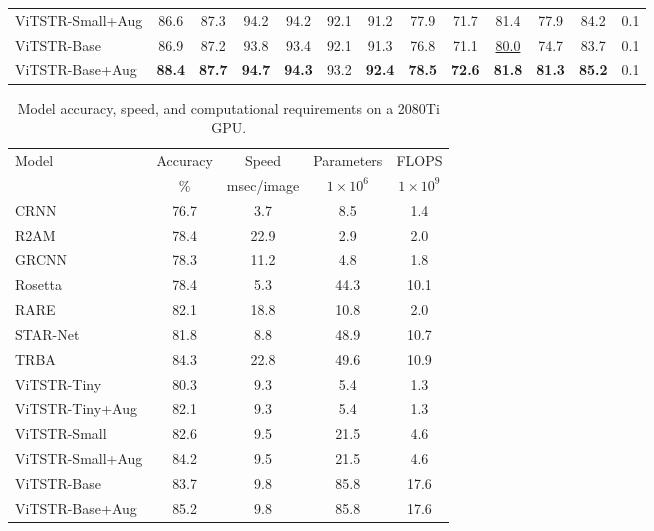 \documentclass[runningheads]{llncs}
\begin{document}
\begin{table}[]
\begin{tabular}{l |c  c  c  c  c  c  c  c  c  c  c  c }
    ViTSTR-Small+Aug & 86.6	&87.3	&94.2	&94.2	&92.1	&91.2	&77.9	&71.7	&81.4	&77.9	&84.2	&0.1\\
    
    ViTSTR-Base &86.9	&87.2	&93.8	&93.4	&92.1	&91.3	&76.8	&71.1	&\underline{80.0}	&74.7	&83.7	&0.1\\
    
    ViTSTR-Base+Aug &\textbf{88.4}	&\textbf{87.7}	&\textbf{94.7}	&\textbf{94.3}	&93.2	&\textbf{92.4}	&\textbf{78.5}	&\textbf{72.6}	&\textbf{81.8}	&\textbf{81.3}	&\textbf{85.2}	&0.1\\
    
    \hline
    \end{tabular}

    \label{tab:model_acc}
\end{table}

\begin{table}[]
    \centering
    \caption{Model accuracy, speed, and computational requirements on a 2080Ti GPU.}
    \begin{tabular}{l|c c c c}
    \hline
     Model & Accuracy & Speed & Parameters & FLOPS  \\
     {} & \% & msec/image & $1\times{10^6}$ & $1\times{10^9}$ \\
     \hline
    CRNN \cite{shi2016end}& 76.7 & 3.7 & 8.5 & 1.4 \\
    R2AM \cite{lee2016recursive}& 78.4 & 22.9 & 2.9 & 2.0 \\
    GRCNN \cite{wang2017gated}& 78.3 & 11.2 & 4.8 & 1.8 \\
    Rosetta \cite{borisyuk2018rosetta}& 78.4 & 5.3 & 44.3 & 10.1\\
    RARE \cite{shi2016robust}& 82.1 & 18.8 & 10.8 & 2.0\\
    STAR-Net \cite{liu2016star}& 81.8 & 8.8 & 48.9 & 10.7\\
    TRBA \cite{baek2019wrong}& 84.3 & 22.8 & 49.6 & 10.9\\
    ViTSTR-Tiny & 80.3 & 9.3 & 5.4 & 1.3\\
    ViTSTR-Tiny+Aug & 82.1 & 9.3 & 5.4 & 1.3\\
    ViTSTR-Small & 82.6 & 9.5 & 21.5 & 4.6\\
    ViTSTR-Small+Aug & 84.2 & 9.5 & 21.5 & 4.6\\
    
    ViTSTR-Base & 83.7 & 9.8 & 85.8 & 17.6\\
    ViTSTR-Base+Aug & 85.2 & 9.8 & 85.8 & 17.6\\
    \hline     
    \end{tabular}

    \label{tab:model_speed}
\end{table}
\end{document}
